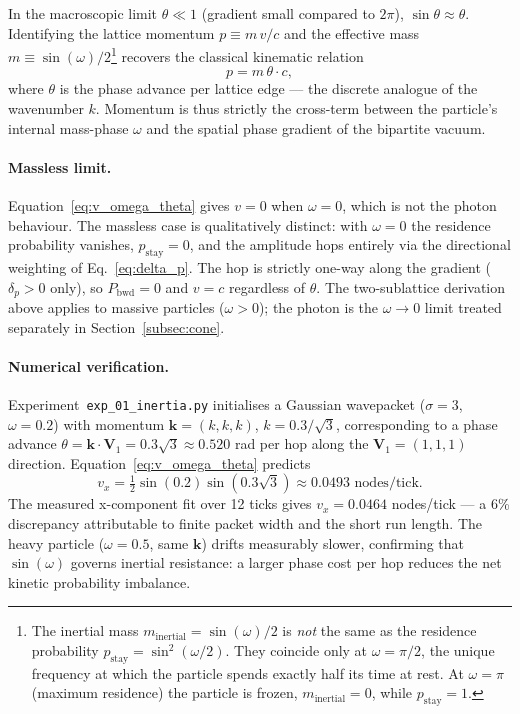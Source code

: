 In the macroscopic limit $\theta \ll 1$ (gradient small compared to
$2\pi$), $\sin\theta \approx \theta$.  Identifying the lattice momentum
$p \equiv m\,v / c$ and the effective mass $m \equiv \sin(\omega)/2$\footnote{%
  The inertial mass $m_\mathrm{inertial} = \sin(\omega)/2$ is \emph{not} the
  same as the residence probability $p_\mathrm{stay} = \sin^2(\omega/2)$.
  They coincide only at $\omega = \pi/2$, the unique frequency at which
  the particle spends exactly half its time at rest.  At $\omega = \pi$
  (maximum residence) the particle is frozen, $m_\mathrm{inertial} = 0$,
  while $p_\mathrm{stay} = 1$.}
recovers the classical kinematic relation
\begin{equation}
    p = m\,\theta \cdot c,
    \label{eq:momentum}
\end{equation}
where $\theta$ is the phase advance per lattice edge — the discrete
analogue of the wavenumber $k$.  Momentum is thus strictly the
cross-term between the particle's internal mass-phase $\omega$ and the
spatial phase gradient of the bipartite vacuum.

\paragraph{Massless limit.}
Equation~\eqref{eq:v_omega_theta} gives $v = 0$ when $\omega = 0$,
which is not the photon behaviour.  The massless case is qualitatively
distinct: with $\omega = 0$ the residence probability vanishes,
$p_\mathrm{stay} = 0$, and the amplitude hops entirely via the
directional weighting of Eq.~\eqref{eq:delta_p}.  The hop is strictly
one-way along the gradient ($\delta_p > 0$ only), so $P_\mathrm{bwd}
= 0$ and $v = c$ regardless of $\theta$.  The two-sublattice
derivation above applies to massive particles ($\omega > 0$); the
photon is the $\omega \to 0$ limit treated separately in
Section~\ref{subsec:cone}.

\paragraph{Numerical verification.}
Experiment~\texttt{exp\_01\_inertia.py} initialises a Gaussian wavepacket
($\sigma = 3$, $\omega = 0.2$) with momentum $\mathbf{k} = (k,k,k)$,
$k = 0.3/\sqrt{3}$, corresponding to a phase advance
$\theta = \mathbf{k} \cdot \mathbf{V}_1 = 0.3\sqrt{3} \approx 0.520$
rad per hop along the $\mathbf{V}_1 = (1,1,1)$ direction.
Equation~\eqref{eq:v_omega_theta} predicts
\[
    v_x = \tfrac{1}{2}\sin(0.2)\sin(0.3\sqrt{3})
        \approx 0.0493 \text{ nodes/tick}.
\]
The measured x-component fit over 12 ticks gives
$v_x = 0.0464$ nodes/tick — a 6\% discrepancy attributable to
finite packet width and the short run length.  The heavy particle
($\omega = 0.5$, same $\mathbf{k}$) drifts measurably slower,
confirming that $\sin(\omega)$ governs inertial resistance: a larger
phase cost per hop reduces the net kinetic probability imbalance.

